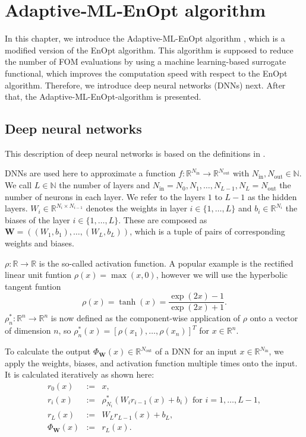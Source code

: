 \chapter{\label{ChapterAdaptiveMLEnOptAlgorithm}Adaptive‑ML‑EnOpt algorithm}

In this chapter, we introduce the Adaptive-ML-EnOpt algorithm \cite{Keil2022-dj}, which is a modified version of the EnOpt algorithm. This algorithm is supposed to reduce the number of FOM evaluations by using a machine learning-based surrogate functional, which improves the computation speed with respect to the EnOpt algorithm. Therefore, we introduce deep neural networks (DNNs) next. After that, the Adaptive-ML-EnOpt-algorithm is presented.

\section{\label{sectionDeepNeuralNetworks}Deep neural networks}

This description of deep neural networks is based on the definitions in \cite{Keil2022-dj}.

DNNs are used here to approximate a function $f:\mathbb{R}^{N_{\mathrm{in}}}\to\mathbb{R}^{N_{\mathrm{out}}}$ with $N_{\mathrm{in}},N_{\mathrm{out}}\in\mathbb{N}$. We call $L\in\mathbb{N}$ the number of layers and $N_{\mathrm{in}}=N_0,N_1,\dotsc,N_{L-1}, N_L=N_{\mathrm{out}}$ the number of neurons in each layer. We refer to the layers $1$ to $L-1$ as the hidden layers. $W_i\in\mathbb{R}^{N_i\times N_{i-1}}$ denotes the weights in layer $i\in\{1,\dotsc,L\}$ and $b_i\in\mathbb{R}^{N_i}$ the biases of the layer $i\in\{1,\dotsc,L\}$. These are composed as $\mathbf{W}=\left((W_1,b_1),\dotsc,(W_L,b_L)\right)$, which is a tuple of pairs of corresponding weights and biases.

$\rho:\mathbb{R}\to\mathbb{R}$ is the so-called activation function. A popular example is the rectified linear unit funtion $\rho(x)=\operatorname{max}(x,0)$, however we will use the hyperbolic tangent funtion
\begin{displaymath}
\rho(x)=\tanh(x)=\frac{\exp(2x)-1}{\exp(2x)+1}.
\end{displaymath}
$\rho_n^*:\mathbb{R}^n\to\mathbb{R}^n$ is now defined as the component-wise application of $\rho$ onto a vector of dimension $n$, so $\rho_n^*(x)=\left[\rho(x_1),\dotsc,\rho(x_n)\right]^T$ for $x\in\mathbb{R}^n$.

To calculate the output $\Phi_\mathbf{W}(x)\in\mathbb{R}^{N_{\mathrm{out}}}$ of a DNN for an input $x\in\mathbb{R}^{N_{\mathrm{in}}}$, we apply the weights, biases, and activation function multiple times onto the input. It is calculated iteratively as shown here:
\begin{eqnarray*}
r_0(x)&:=&x,\\
r_i(x)&:=&\rho_{N_i}^*(W_ir_{i-1}(x)+b_i)\text{ for }i=1,\dotsc,L-1,\\
r_L(x)&:=&W_Lr_{L-1}(x)+b_L,\\
\Phi_\mathbf{W}(x)&:=&r_L(x).
\end{eqnarray*}


